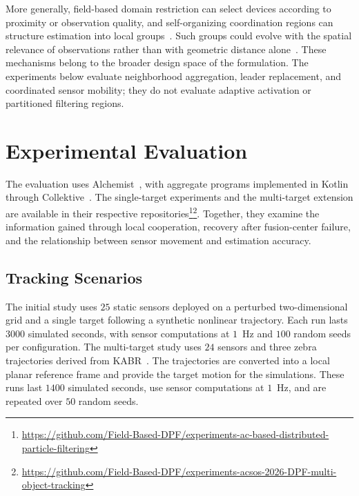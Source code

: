 More generally, 
 field-based domain restriction can select devices according to proximity 
 or observation quality, and self-organizing coordination regions 
 can structure estimation into local groups~\cite{DBLP:journals/fgcs/PianiniCVN21}.
%
Such groups could evolve with the spatial relevance of observations rather than 
 with geometric distance alone~\cite{DBLP:journals/lmcs/CasadeiMPVZ23}.
%
These mechanisms belong to the broader design space of the formulation.
%
The experiments below evaluate neighborhood aggregation, leader replacement, 
 and coordinated sensor mobility; 
 they do not evaluate adaptive activation or partitioned filtering regions.

\section{Experimental Evaluation}
\label{sec:dpf-evaluation}

The evaluation uses Alchemist~\cite{DBLP:journals/jos/PianiniMV13}, 
 with aggregate programs implemented in Kotlin through 
 Collektive~\cite{DBLP:conf/acsos/Cortecchia24}.
%
The single-target experiments and the multi-target extension 
 are available in their respective 
 repositories\footnote{\url{https://github.com/Field-Based-DPF/experiments-ac-based-distributed-particle-filtering}}\footnote{\url{https://github.com/Field-Based-DPF/experiments-acsos-2026-DPF-multi-object-tracking}}.
%
Together, 
 they examine the information gained through local cooperation, recovery after fusion-center failure, 
 and the relationship between sensor movement and estimation accuracy.

\subsection{Tracking Scenarios}
\label{subsec:dpf-setup}

The initial study uses $25$ static sensors deployed on a perturbed two-dimensional grid 
 and a single target following a synthetic nonlinear trajectory.
%
Each run lasts $3000$ simulated seconds, 
 with sensor computations at $1$~Hz and $100$ random seeds per configuration.
%
The multi-target study uses $24$ sensors and three zebra trajectories derived 
 from KABR~\cite{DBLP:conf/wacv/KholiavchenkoKRSSBBCTTMBDBRS24}.
%
The trajectories are converted into a local planar reference frame 
 and provide the target motion for the simulations.
%
These runs last $1400$ simulated seconds, 
 use sensor computations at $1$~Hz, 
 and are repeated over $50$ random seeds.

